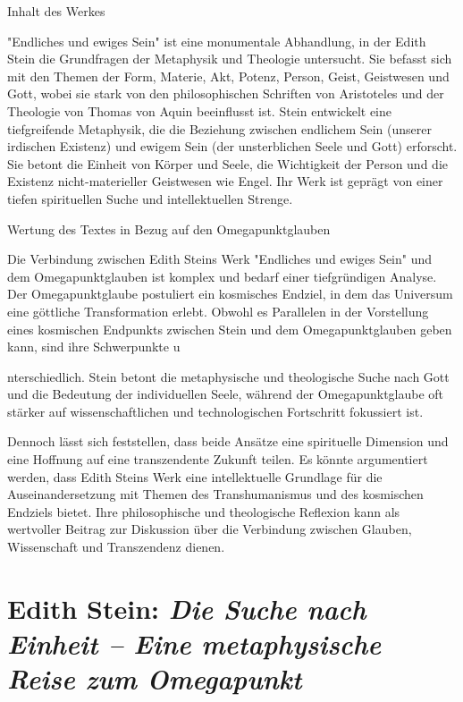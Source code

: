 \documentclass[
]{article}
\begin{document}
Inhalt des Werkes

"Endliches und ewiges Sein" ist eine monumentale Abhandlung, in der Edith Stein die Grundfragen der Metaphysik und Theologie untersucht. Sie befasst sich mit den Themen der Form, Materie, Akt, Potenz, Person, Geist, Geistwesen und Gott, wobei sie stark von den philosophischen Schriften von Aristoteles und der Theologie von Thomas von Aquin beeinflusst ist. Stein entwickelt eine tiefgreifende Metaphysik, die die Beziehung zwischen endlichem Sein (unserer irdischen Existenz) und ewigem Sein (der unsterblichen Seele und Gott) erforscht. Sie betont die Einheit von Körper und Seele, die Wichtigkeit der Person und die Existenz nicht-materieller Geistwesen wie Engel. Ihr Werk ist geprägt von einer tiefen spirituellen Suche und intellektuellen Strenge.

Wertung des Textes in Bezug auf den Omegapunktglauben

Die Verbindung zwischen Edith Steins Werk "Endliches und ewiges Sein" und dem Omegapunktglauben ist komplex und bedarf einer tiefgründigen Analyse. Der Omegapunktglaube postuliert ein kosmisches Endziel, in dem das Universum eine göttliche Transformation erlebt. Obwohl es Parallelen in der Vorstellung eines kosmischen Endpunkts zwischen Stein und dem Omegapunktglauben geben kann, sind ihre Schwerpunkte u

nterschiedlich. Stein betont die metaphysische und theologische Suche nach Gott und die Bedeutung der individuellen Seele, während der Omegapunktglaube oft stärker auf wissenschaftlichen und technologischen Fortschritt fokussiert ist.

Dennoch lässt sich feststellen, dass beide Ansätze eine spirituelle Dimension und eine Hoffnung auf eine transzendente Zukunft teilen. Es könnte argumentiert werden, dass Edith Steins Werk eine intellektuelle Grundlage für die Auseinandersetzung mit Themen des Transhumanismus und des kosmischen Endziels bietet. Ihre philosophische und theologische Reflexion kann als wertvoller Beitrag zur Diskussion über die Verbindung zwischen Glauben, Wissenschaft und Transzendenz dienen.

\section{\texorpdfstring{Edith Stein: \emph{Die Suche nach Einheit -- Eine metaphysische Reise zum Omegapunkt}}{Edith Stein: Die Suche nach Einheit -- Eine metaphysische Reise zum Omegapunkt}}\label{edith-stein-die-suche-nach-einheit-eine-metaphysische-reise-zum-omegapunkt}
\end{document}
